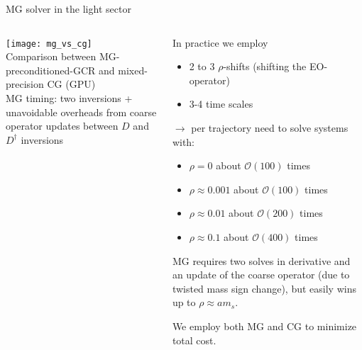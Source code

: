\documentclass[xcolor={dvipsnames,table}]{beamer}
\begin{document}
\begin{frame}{MG solver in the light sector}
  \begin{columns}
      \centering
      \texttt{[image: mg\_vs\_cg]} \\
      \small{Comparison between MG-preconditioned-GCR and mixed-precision CG (GPU)\\
      MG timing: two inversions + unavoidable overheads from coarse operator updates between $D$ and $D^\dagger$ inversions}
      \begin{hpcablock}{}
        In practice we employ
        \begin{itemize}
          \item 2 to 3 $\rho$-shifts (shifting the EO-operator) 
          \item 3-4 time scales
        \end{itemize}
        $\rightarrow$ per trajectory need to solve systems with: 
        \begin{itemize}
          \item $\rho = 0$ about $\mathcal{O}(100)$ times
          \vspace{0.2cm}
          \item $\rho \approx 0.001$ about $\mathcal{O}(100)$ times
          \vspace{0.2cm}
          \item $\rho \approx 0.01$ about $\mathcal{O}(200)$ times
          \vspace{0.2cm}
          \item $\rho \approx 0.1$ about $\mathcal{O}(400)$ times
          \vspace{0.2cm}
        \end{itemize}
        MG requires two solves in derivative and an update of the coarse operator (due to twisted mass sign change), but easily wins up to $\rho \approx am_s$.

        We employ both MG and CG to minimize total cost.
      \end{hpcablock}
  \end{columns}
\end{frame}
\end{document}
